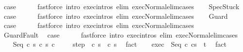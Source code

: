 \begin{isabellebody}
\ {\isacharquery}case\isanewline
\ \ \ \ \isamarkupfalse%
\ {\isacharparenleft}fastforce\ intro{\isacharcolon}\ exec{\isachardot}intros\ elim{\isacharcolon}\ exec{\isacharunderscore}Normal{\isacharunderscore}elim{\isacharunderscore}cases{\isacharparenright}\isanewline
{}\isamarkupfalse%
\isanewline
\ \ \isamarkupfalse%
\ SpecStuck\ \isamarkupfalse%
\ {\isacharquery}case\isanewline
\ \ \ \ \isamarkupfalse%
\ {\isacharparenleft}fastforce\ intro{\isacharcolon}\ exec{\isachardot}intros\ elim{\isacharcolon}\ exec{\isacharunderscore}Normal{\isacharunderscore}elim{\isacharunderscore}cases{\isacharparenright}\isanewline
{}\isamarkupfalse%
\isanewline
\ \ \isamarkupfalse%
\ Guard\ \isamarkupfalse%
\ {\isacharquery}case\isanewline
\ \ \ \ \isamarkupfalse%
\ {\isacharparenleft}fastforce\ intro{\isacharcolon}\ exec{\isachardot}intros\ elim{\isacharcolon}\ exec{\isacharunderscore}Normal{\isacharunderscore}elim{\isacharunderscore}cases{\isacharparenright}\isanewline
{}\isamarkupfalse%
\ \ \isanewline
\ \ \isamarkupfalse%
\ GuardFault\ \isamarkupfalse%
\ {\isacharquery}case\isanewline
\ \ \ \ \isamarkupfalse%
\ {\isacharparenleft}fastforce\ intro{\isacharcolon}\ exec{\isachardot}intros\ elim{\isacharcolon}\ exec{\isacharunderscore}Normal{\isacharunderscore}elim{\isacharunderscore}cases{\isacharparenright}\isanewline
{}\isamarkupfalse%
\isanewline
\ \ \isamarkupfalse%
\ {\isacharparenleft}Seq\ c\ s\ c\ s{\isacharprime}\ c\ \isanewline
\ \ \isamarkupfalse%
\ step{\isacharcolon}\ {\isachardoublequoteopen}{\isasymGamma}{\isasymturnstile}\ {\isacharparenleft}c\ s{\isacharparenright}\ {\isasymrightarrow}\ {\isacharparenleft}c\ s{\isacharprime}{\isacharparenright}{\isachardoublequoteclose}\ \isamarkupfalse%
\ fact\isanewline
\ \ \isamarkupfalse%
\ exec{\isacharprime}{\isacharcolon}\ {\isachardoublequoteopen}{\isasymGamma}{\isasymturnstile}\ {\isasymlangle}Seq\ c\ cs{\isacharprime}{\isasymrangle}\ {\isasymRightarrow}\ t{\isachardoublequoteclose}\ \isamarkupfalse%
\ fact\isanewline
\ \ \isamarkupfalse%

\end{isabellebody}
